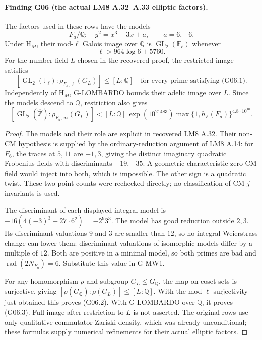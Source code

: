 \documentclass[11pt,a4paper]{article}
\begin{document}
\paragraph{Finding G06 (the actual LM8 A.32--A.33 elliptic factors).}
The factors used in these rows have the models
\[
 F_a/\mathbb Q:\quad y^2=x^3-3x+a,\qquad a=6,-6.
\]
Under $\mathrm H_M$, their mod-$\ell$ Galois image over $\mathbb Q$ is
$\operatorname{GL}_2(\mathbb F_\ell)$ whenever
\[
 \ell>964\log6+5760. \tag{G06.1}
\]
For the number field $L$ chosen in the recovered proof, the restricted
image satisfies
\[
 [\operatorname{GL}_2(\mathbb F_\ell):
       \overline\rho_{F_a,\ell}(G_L)]\le[L:\mathbb Q]
 \quad\text{for every prime satisfying (G06.1).} \tag{G06.2}
\]
Independently of $\mathrm H_M$, G-LOMBARDO bounds their adelic image
over $L$. Since the models descend to $\mathbb Q$, restriction also gives
\[
 [\operatorname{GL}_2(\widehat{\mathbb Z}):\rho_{F_a,\infty}(G_L)]
 <[L:\mathbb Q]\,\exp(10^{21483})
          \max\{1,h_F(F_a)\}^{4.8\cdot10^{10}}. \tag{G06.3}
\]

\begin{proof}
The models and their role are explicit in recovered LM8 A.32.
Their non-CM hypothesis is supplied by the ordinary-reduction
argument of LM8 A.14: for $F_6$, the traces at $5,11$ are $-1,3$,
giving the distinct imaginary quadratic Frobenius fields with
discriminants $-19,-35$. A geometric characteristic-zero CM field
would inject into both, which is impossible. The other sign is a
quadratic twist. These two point counts were rechecked directly;
no classification of CM $j$-invariants is used.

The discriminant of each displayed integral model is
$-16(4(-3)^3+27\cdot6^2)=-2^9 3^3$.
The model has good reduction outside $2,3$. Its discriminant valuations
$9$ and $3$ are smaller than $12$, so no integral Weierstrass change
can lower them: discriminant valuations of isomorphic models differ
by a multiple of $12$. Both are positive in a minimal model, so both
primes are bad and $\operatorname{rad}(2N_{F_a})=6$.
Substitute this value in G-MW1.

For any homomorphism $\rho$ and subgroup $G_L\le G_{\mathbb Q}$,
the map on coset sets is surjective, giving
$[\rho(G_{\mathbb Q}):\rho(G_L)]\le[L:\mathbb Q]$.
With the mod-$\ell$ surjectivity just obtained this proves (G06.2).
With G-LOMBARDO over $\mathbb Q$, it proves (G06.3).
Full image after restriction to $L$ is not asserted. The original
rows use only qualitative commutator Zariski density, which was
already unconditional; these formulas supply numerical refinements
for their actual elliptic factors.
\end{proof}
\end{document}
